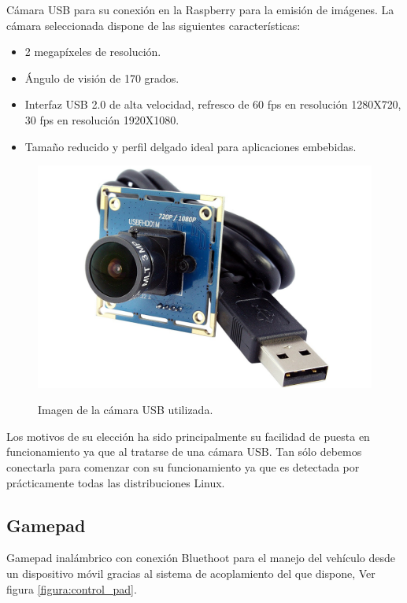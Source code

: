 Cámara USB para su conexión en la Raspberry para la emisión de imágenes. La cámara seleccionada dispone de las siguientes características:

\begin{itemize}
\item 2 megapíxeles de resolución.
\item Ángulo de visión de 170 grados.
\item Interfaz USB 2.0 de alta velocidad, refresco de 60 fps en resolución 1280X720, 30 fps en resolución 1920X1080.
\item Tamaño reducido y perfil delgado ideal para aplicaciones embebidas.
\end{itemize}

\begin{figure}[H]
  \begin{center}
    \includegraphics[scale=0.15]{imagenes/robot/camara-usb.jpg}\\
    \caption{Imagen de la cámara USB utilizada.}
  \end{center}
\end{figure}

Los motivos de su elección ha sido principalmente su facilidad de puesta en funcionamiento ya que al tratarse de una cámara USB. Tan sólo debemos conectarla para comenzar con su funcionamiento ya que es detectada 
por prácticamente todas las distribuciones Linux.\\

\subsection{Gamepad}

Gamepad inalámbrico con conexión Bluethoot para el manejo del vehículo desde un dispositivo móvil gracias al sistema de acoplamiento del que dispone, Ver figura \ref{figura:control_pad}.

